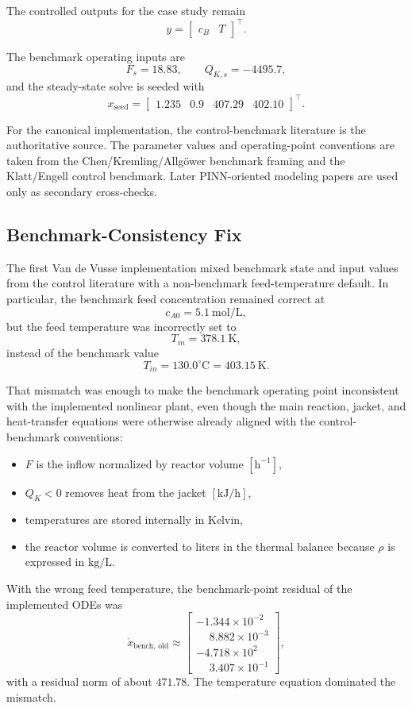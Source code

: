 The controlled outputs for the case study remain
\[
y = \begin{bmatrix} c_B & T \end{bmatrix}^{\top}.
\]

The benchmark operating inputs are
\[
F_s = 18.83,\qquad Q_{K,s} = -4495.7,
\]
and the steady-state solve is seeded with
\[
x_{\text{seed}} = \begin{bmatrix} 1.235 & 0.9 & 407.29 & 402.10 \end{bmatrix}^{\top}.
\]

For the canonical implementation, the control-benchmark literature is the authoritative source. The parameter values and operating-point conventions are taken from the Chen/Kremling/Allg\"ower benchmark framing and the Klatt/Engell control benchmark. Later PINN-oriented modeling papers are used only as secondary cross-checks.

\subsection{Benchmark-Consistency Fix}

The first Van de Vusse implementation mixed benchmark state and input values from the control literature with a non-benchmark feed-temperature default. In particular, the benchmark feed concentration remained correct at
\[
c_{A0} = 5.1~\mathrm{mol/L},
\]
but the feed temperature was incorrectly set to
\[
T_{in} = 378.1~\mathrm{K},
\]
instead of the benchmark value
\[
T_{in} = 130.0^\circ\mathrm{C} = 403.15~\mathrm{K}.
\]

That mismatch was enough to make the benchmark operating point inconsistent with the implemented nonlinear plant, even though the main reaction, jacket, and heat-transfer equations were otherwise already aligned with the control-benchmark conventions:
\begin{itemize}
    \item \(F\) is the inflow normalized by reactor volume \([\mathrm{h}^{-1}]\),
    \item \(Q_K < 0\) removes heat from the jacket \([\mathrm{kJ/h}]\),
    \item temperatures are stored internally in Kelvin,
    \item the reactor volume is converted to liters in the thermal balance because \(\rho\) is expressed in \(\mathrm{kg/L}\).
\end{itemize}

With the wrong feed temperature, the benchmark-point residual of the implemented ODEs was
\[
\dot x_{\text{bench, old}} \approx
\begin{bmatrix}
-1.344 \times 10^{-2}\\
\phantom{-}8.882 \times 10^{-3}\\
-4.718 \times 10^{2}\\
\phantom{-}3.407 \times 10^{-1}
\end{bmatrix},
\]
with a residual norm of about \(471.78\). The temperature equation dominated the mismatch.

